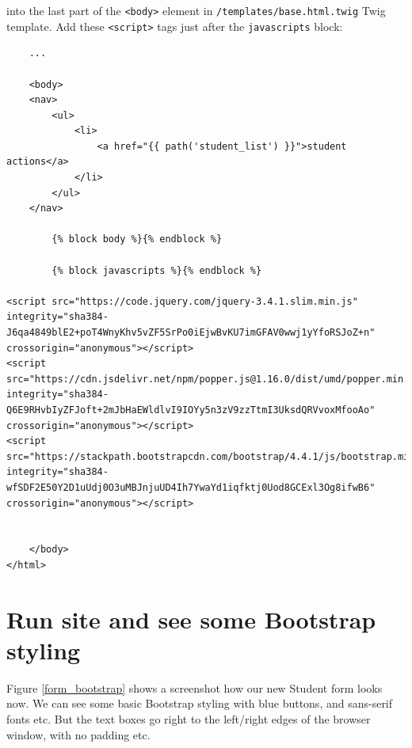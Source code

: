 \documentclass[a4paperpaper,openright]{book}
\begin{document}
into the last part of the \texttt{\textless{}body\textgreater{}} element
in \texttt{/templates/base.html.twig} Twig template. Add these
\texttt{\textless{}script\textgreater{}} tags just after the
\texttt{javascripts} block:

\begin{verbatim}
    ...
    
    <body>
    <nav>
        <ul>
            <li>
                <a href="{{ path('student_list') }}">student actions</a>
            </li>
        </ul>
    </nav>
    
        {% block body %}{% endblock %}
    
        {% block javascripts %}{% endblock %}
    
<script src="https://code.jquery.com/jquery-3.4.1.slim.min.js" integrity="sha384-J6qa4849blE2+poT4WnyKhv5vZF5SrPo0iEjwBvKU7imGFAV0wwj1yYfoRSJoZ+n" crossorigin="anonymous"></script>
<script src="https://cdn.jsdelivr.net/npm/popper.js@1.16.0/dist/umd/popper.min.js" integrity="sha384-Q6E9RHvbIyZFJoft+2mJbHaEWldlvI9IOYy5n3zV9zzTtmI3UksdQRVvoxMfooAo" crossorigin="anonymous"></script>
<script src="https://stackpath.bootstrapcdn.com/bootstrap/4.4.1/js/bootstrap.min.js" integrity="sha384-wfSDF2E50Y2D1uUdj0O3uMBJnjuUD4Ih7YwaYd1iqfktj0Uod8GCExl3Og8ifwB6" crossorigin="anonymous"></script>

    
    </body>
</html>
\end{verbatim}

\hypertarget{run-site-and-see-some-bootstrap-styling}{%
\section{Run site and see some Bootstrap
styling}\label{run-site-and-see-some-bootstrap-styling}}

Figure \ref{form_bootstrap} shows a screenshot how our new Student form
looks now. We can see some basic Bootstrap styling with blue buttons,
and sans-serif fonts etc. But the text boxes go right to the left/right
edges of the browser window, with no padding etc.
\end{document}
